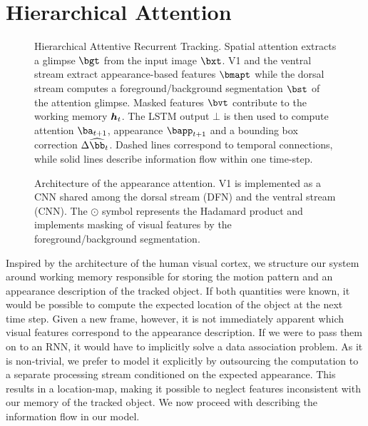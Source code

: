 \section{Hierarchical Attention}
\label{sec:att}


	\begin{figure}[ht]
		\centering
	 	\usebox{\systemfig}
	 	\caption{Hierarchical Attentive Recurrent Tracking. Spatial attention extracts a glimpse $\bgt$ from the input image $\bxt$. V1 and the ventral stream extract appearance-based features $\bmapt$ while the dorsal stream computes a foreground/background segmentation $\bst$ of the attention glimpse. Masked features $\bvt$ contribute to the working memory $\B{h}_t$. The LSTM output $\bot$ is then used to compute attention $\ba_{t+1}$, appearance $\bapp_{t+1}$ and a bounding box correction $\Delta \widehat{\bb}_t$. Dashed lines correspond to temporal connections, while solid lines describe information flow within one time-step.}
		\label{fig:system}
	\end{figure}
	

    \begin{SCfigure}[50]
		\usebox{\archfig}
		\caption{Architecture of the appearance attention. V1 is implemented as a CNN shared among the dorsal stream (DFN) and the ventral stream (CNN). The $\odot$ symbol represents the Hadamard product and implements masking of visual features by the foreground/background segmentation.}
		\label{fig:arch}
	\end{SCfigure}

	Inspired by the architecture of the human visual cortex, we structure our system around working memory responsible for storing the motion pattern and an appearance description of the tracked object. If both quantities were known, it would be possible to compute the expected location of the object at the next time step. Given a new frame, however, it is not immediately apparent which visual features correspond to the appearance description. If we were to pass them on to an RNN, it would have to implicitly solve a data association problem. As it is non-trivial, we prefer to model it explicitly by outsourcing the computation to a separate processing stream conditioned on the expected appearance. This results in a location-map, making it possible to neglect features inconsistent with our memory of the tracked object. We now proceed with describing the information flow in our model.
    
